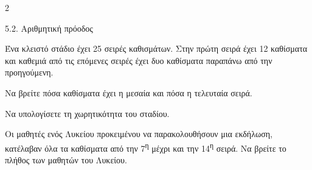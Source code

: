 \begin{ylh}{2}
    \item 5.2. Αριθμητική πρόοδος
\end{ylh}
Ένα κλειστό στάδιο έχει 25 σειρές καθισμάτων. Στην πρώτη σειρά έχει 12 καθίσματα και καθεμιά από τις επόμενες σειρές έχει δυο καθίσματα παραπάνω από την προηγούμενη.

\begin{alist}
\item Να βρείτε πόσα καθίσματα έχει η μεσαία και πόσα η τελευταία σειρά.
\item Να υπολογίσετε τη χωρητικότητα του σταδίου.
\item Οι μαθητές ενός Λυκείου προκειμένου να παρακολουθήσουν μια εκδήλωση, κατέλαβαν όλα τα καθίσματα από την 7\textsuperscript{η} μέχρι και την 14\textsuperscript{η} σειρά. Να βρείτε το πλήθος των μαθητών του Λυκείου.
\end{alist}

